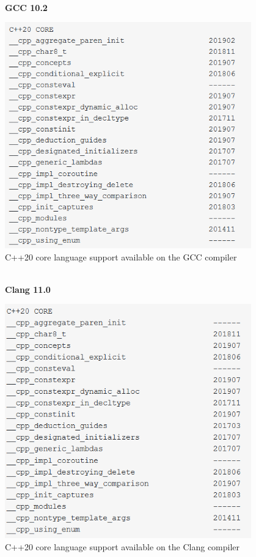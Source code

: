 \hspace*{\fill} \\ %
\noindent
\textbf{GCC 10.2}

\begin{center}
\includegraphics[width=0.8\textwidth]{content/5/chapter9/images/3.png}\\
C++20 core language support available on the GCC compiler
\end{center}


\hspace*{\fill} \\ %
\noindent
\textbf{Clang 11.0}

\begin{center}
\includegraphics[width=0.8\textwidth]{content/5/chapter9/images/4.png}\\
C++20 core language support available on the Clang compiler
\end{center}


